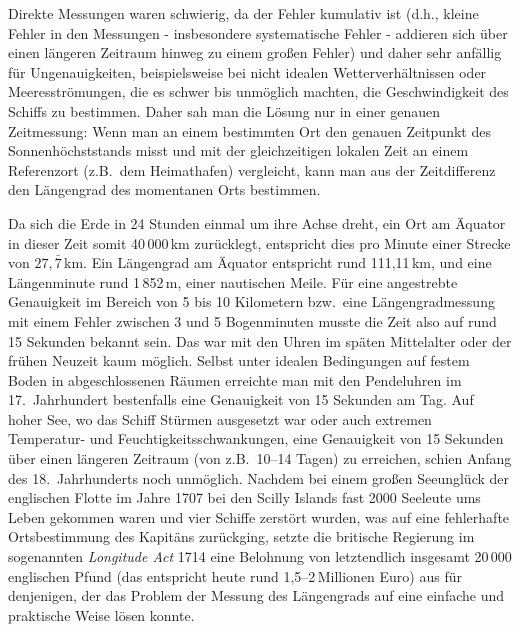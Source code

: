 Direkte Messungen waren schwierig, da der Fehler kumulativ ist (d.h., kleine Fehler in den 
Messungen - insbesondere systematische Fehler - 
addieren sich \"uber einen l\"angeren Zeitraum hinweg zu
einem gro\ss en Fehler) und daher sehr anf\"allig f\"ur Ungenauigkeiten, beispielsweise
bei nicht idealen Wetterverh\"altnissen oder Meeresstr\"omungen, die es schwer bis unm\"oglich
machten, die Geschwindigkeit des Schiffs zu bestimmen. 
Daher sah man die L\"osung nur in einer genauen
Zeitmessung: Wenn man an einem bestimmten Ort den genauen Zeitpunkt des
Sonnenh\"ochststands misst und mit der gleichzeitigen lokalen Zeit an einem Referenzort
(z.B.\ dem Heimathafen) vergleicht, kann man aus der Zeitdifferenz den L\"angengrad des momentanen
Orts bestimmen. 

Da sich die Erde in 24 Stunden einmal um ihre Achse dreht, ein Ort am \"Aquator in dieser Zeit somit
40\,000\,km \glqq zur\"ucklegt\grqq, entspricht dies pro Minute einer Strecke von $27,\bar{7}$\,km. 
Ein L\"angengrad am \"Aquator entspricht rund 111,11\,km, und eine L\"angenminute rund 1\,852\,m,
einer nautischen Meile. 
F\"ur eine angestrebte Genauigkeit im Bereich von 5 bis 10 Kilometern bzw.\ eine L\"angengradmessung
mit einem Fehler zwischen 3 und 5 Bogenminuten musste die Zeit also auf
rund 15 Sekunden bekannt sein. Das war mit den Uhren im sp\"aten Mittelalter oder der fr\"uhen
Neuzeit kaum m\"oglich. Selbst unter idealen Bedingungen auf festem Boden in abgeschlossenen
R\"aumen erreichte man mit den Pendeluhren 
im 17.\ Jahrhundert bestenfalls eine Genauigkeit von
15 Sekunden am Tag. Auf hoher See, wo das Schiff St\"urmen ausgesetzt war oder auch extremen
Temperatur- und Feuchtigkeitsschwankungen, eine Genauigkeit von 15 Sekunden \"uber einen l\"angeren
Zeitraum (von z.B.\ 10--14 Tagen) zu erreichen, schien Anfang des 18.\ Jahrhunderts noch unm\"oglich.
Nachdem bei einem gro\ss en Seeungl\"uck der englischen Flotte im Jahre 1707 bei den Scilly Islands 
fast 2000 Seeleute ums Leben gekommen waren und vier Schiffe zerst\"ort wurden, was
auf eine fehlerhafte Ortsbestimmung des Kapit\"ans zur\"uckging, setzte die britische Regierung im
sogenannten \textit{Longitude Act} 
1714 eine Belohnung von letztendlich insgesamt 20\,000 englischen Pfund (das entspricht
heute rund 1,5--2\,Millionen Euro) aus f\"ur denjenigen, der das Problem der Messung des L\"angengrads
auf eine einfache und praktische Weise l\"osen konnte. 

